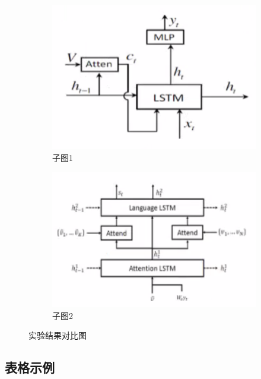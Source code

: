 \documentclass[a4paper]{article}
\begin{document}
\begin{figure}[H]
    \centering
    \begin{subfigure}[b]{0.4\textwidth}
        \includegraphics[width=\textwidth]{images/image1.png}
        \caption{子图1}
        \label{fig:sub_image1}
    \end{subfigure}
    \hfill
    \begin{subfigure}[b]{0.4\textwidth}
        \includegraphics[width=\textwidth]{images/image2.png}
        \caption{子图2}
        \label{fig:sub_image2}
    \end{subfigure}
    \caption{实验结果对比图}
    \label{fig:comparison}
\end{figure}

\subsection{表格示例}
\end{document}
